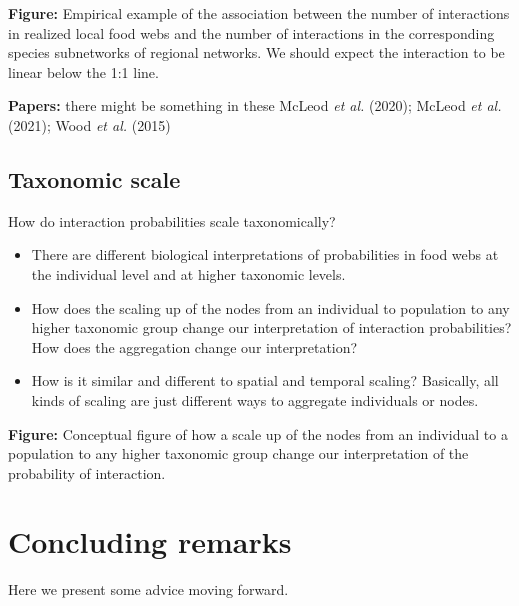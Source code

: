\documentclass[10pt,oneside]{article}
\begin{document}
\textbf{Figure:} Empirical example of the association between the number
of interactions in realized local food webs and the number of
interactions in the corresponding species subnetworks of regional
networks. We should expect the interaction to be linear below the 1:1
line.

\textbf{Papers:} there might be something in these McLeod \emph{et al.}
(2020); McLeod \emph{et al.} (2021); Wood \emph{et al.} (2015)

\hypertarget{taxonomic-scale}{%
\subsection{Taxonomic scale}\label{taxonomic-scale}}

How do interaction probabilities scale taxonomically?

\begin{itemize}
\tightlist
\item
  There are different biological interpretations of probabilities in
  food webs at the individual level and at higher taxonomic levels.
\item
  How does the scaling up of the nodes from an individual to population
  to any higher taxonomic group change our interpretation of interaction
  probabilities? How does the aggregation change our interpretation?
\item
  How is it similar and different to spatial and temporal scaling?
  Basically, all kinds of scaling are just different ways to aggregate
  individuals or nodes.
\end{itemize}

\textbf{Figure:} Conceptual figure of how a scale up of the nodes from
an individual to a population to any higher taxonomic group change our
interpretation of the probability of interaction.

\hypertarget{concluding-remarks}{%
\section{Concluding remarks}\label{concluding-remarks}}

Here we present some advice moving forward.
\end{document}
